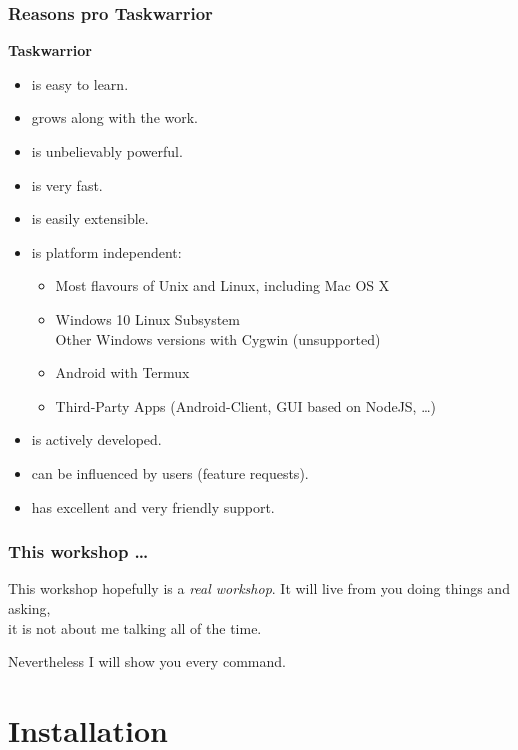 \documentclass[t,handout]{beamer}
\begin{document}
\begin{frame}[fragile]\frametitle{Reasons pro Taskwarrior}
    \vfill
    \textbf{Taskwarrior} \pause
    \begin{itemize}
    	\item is easy to learn. \pause
    	\item grows along with the work. \pause
    	\item is unbelievably powerful. \pause
    	\item is very fast. \pause
    	\item is easily extensible. \pause
    	\item is platform independent:
    	\begin{itemize}
    		\item Most flavours of Unix and Linux, including Mac OS X
            \item Windows 10 Linux Subsystem \\
                Other Windows versions with Cygwin (unsupported)
    		\item Android with Termux
            \item Third-Party Apps (Android-Client, GUI based on NodeJS, \ldots)
    	\end{itemize} \pause
    	\item is actively developed. \pause
    	\item can be influenced by users (feature requests). \pause
    	\item has excellent and very friendly support.
    \end{itemize}
\end{frame}

\begin{frame}[fragile]\frametitle{This workshop \ldots}
    \vfill

    \begin{alertblock}{This workshop hopefully is a \textit{real workshop}.}
        It will live from you doing things and asking, \\
        it is not about me talking all of the time.
    \end{alertblock}

    {\tiny Nevertheless I will show you every command.}
\end{frame}

\section{Installation}
\end{document}
